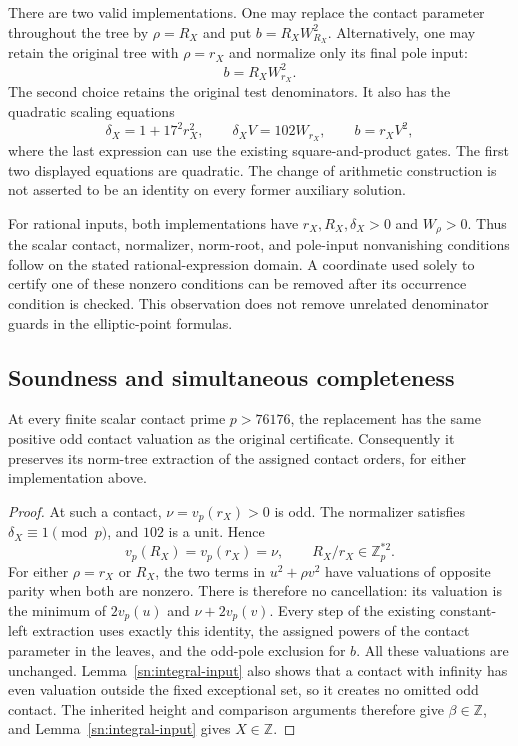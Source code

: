 There are two valid implementations.  One may replace the contact
parameter throughout the tree by $\rho=R_X$ and put
$b=R_XW_{R_X}^2$.  Alternatively, one may retain the original
tree with $\rho=r_X$ and normalize only its final pole input:
\[
                       b=R_XW_{r_X}^2.
\]
The second choice retains the original test denominators.  It
also has the quadratic scaling equations
\[
        \delta_X=1+17^2r_X^2,\qquad
        \delta_X V=102W_{r_X},\qquad b=r_XV^2,
\]
where the last expression can use the existing square-and-product
gates.  The first two displayed equations are quadratic.
The change of arithmetic construction is not asserted to be an
identity on every former auxiliary solution.

For rational inputs, both implementations have $r_X,R_X,\delta_X>0$
and $W_\rho>0$.  Thus the scalar contact, normalizer, norm-root,
and pole-input nonvanishing conditions follow on the stated
rational-expression domain.  A coordinate used solely to certify
one of these nonzero conditions can be removed after its occurrence
condition is checked.  This observation does not remove unrelated
denominator guards in the elliptic-point formulas.

\subsection{Soundness and simultaneous completeness}

\begin{proposition}\label{sn:contact-preservation}
At every finite scalar contact prime $p>76176$, the replacement
has the same positive odd contact valuation as the original
certificate.  Consequently it preserves its norm-tree extraction
of the assigned contact orders, for either implementation above.
\end{proposition}
\begin{proof}
At such a contact, $\nu=v_p(r_X)>0$ is odd.  The normalizer
satisfies $\delta_X\equiv1\pmod p$, and $102$ is a unit.
Hence
\[
               v_p(R_X)=v_p(r_X)=\nu,
 \qquad R_X/r_X\in\mathbb Z_p^{*2}.
\]
For either $\rho=r_X$ or $R_X$, the two terms in
$u^2+\rho v^2$ have valuations of opposite parity when both
are nonzero.  There is therefore no cancellation: its valuation
is the minimum of $2v_p(u)$ and $\nu+2v_p(v)$.
Every step of the existing constant-left extraction uses exactly
this identity, the assigned powers of the contact parameter in
the leaves, and the odd-pole exclusion for $b$.  All these
valuations are unchanged.  Lemma~\ref{sn:integral-input}
also shows that a contact with infinity has even valuation
outside the fixed exceptional set, so it creates no omitted
odd contact.  The inherited height and comparison arguments
therefore give $\beta\in\mathbb Z$, and
Lemma~\ref{sn:integral-input} gives $X\in\mathbb Z$.
\end{proof}

